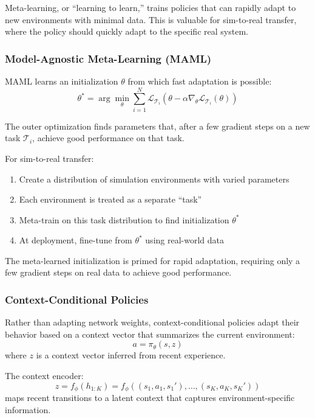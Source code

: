 Meta-learning, or ``learning to learn,'' trains policies that can rapidly adapt to new environments with minimal data. This is valuable for sim-to-real transfer, where the policy should quickly adapt to the specific real system.

\subsubsection{Model-Agnostic Meta-Learning (MAML)}

MAML learns an initialization $\theta$ from which fast adaptation is possible:
\begin{equation}
\theta^* = \arg\min_\theta \sum_{i=1}^{N} \mathcal{L}_{\mathcal{T}_i}(\theta - \alpha \nabla_\theta \mathcal{L}_{\mathcal{T}_i}(\theta))
\label{eq:maml_objective}
\end{equation}

The outer optimization finds parameters that, after a few gradient steps on a new task $\mathcal{T}_i$, achieve good performance on that task.

For sim-to-real transfer:
\begin{enumerate}
    \item Create a distribution of simulation environments with varied parameters
    \item Each environment is treated as a separate ``task''
    \item Meta-train on this task distribution to find initialization $\theta^*$
    \item At deployment, fine-tune from $\theta^*$ using real-world data
\end{enumerate}

The meta-learned initialization is primed for rapid adaptation, requiring only a few gradient steps on real data to achieve good performance.

\subsubsection{Context-Conditional Policies}

Rather than adapting network weights, context-conditional policies adapt their behavior based on a context vector that summarizes the current environment:
\begin{equation}
a = \pi_\theta(s, z)
\end{equation}
where $z$ is a context vector inferred from recent experience.

The context encoder:
\begin{equation}
z = f_\phi(h_{1:K}) = f_\phi((s_1, a_1, s_1'), \ldots, (s_K, a_K, s_K'))
\end{equation}
maps recent transitions to a latent context that captures environment-specific information.

